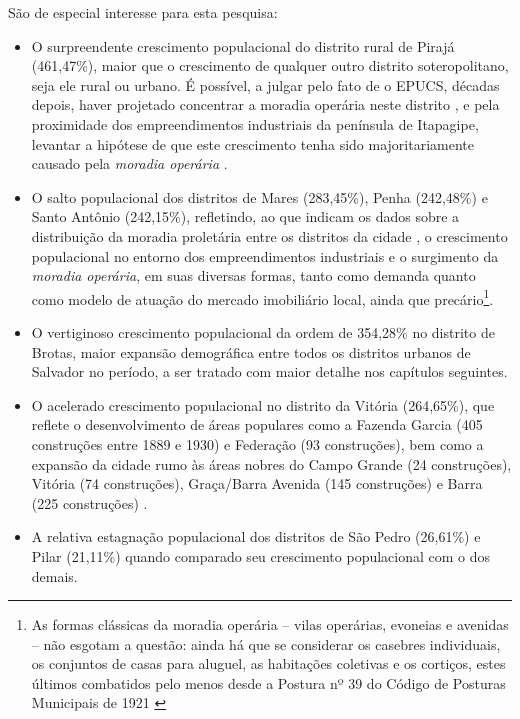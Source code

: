 


São de especial interesse para esta pesquisa:

\begin{itemize}
\item O surpreendente crescimento populacional do distrito rural de Pirajá (461,47\%), maior que o crescimento de qualquer outro distrito soteropolitano, seja ele rural ou urbano. É possível, a julgar pelo fato de o EPUCS, décadas depois, haver projetado concentrar a moradia operária neste distrito \cite{PREFEITURA1978,sampaio_formas_1999}, e pela proximidade dos empreendimentos industriais da península de Itapagipe, levantar a hipótese de que este crescimento tenha sido majoritariamente causado pela \textit{moradia operária} \cite{cardoso_vilas_1991}.
\item O salto populacional dos distritos de Mares (283,45\%), Penha (242,48\%) e Santo Antônio (242,15\%), refletindo, ao que indicam os dados sobre a distribuição da moradia proletária entre os distritos da cidade \cite[p.~126]{cardoso_vilas_1991}, o crescimento populacional no entorno dos empreendimentos industriais e o surgimento da \textit{moradia operária}, em suas diversas formas, tanto como demanda quanto como modelo de atuação do mercado imobiliário local, ainda que precário\footnote{As formas clássicas da moradia operária -- vilas operárias, evoneias e avenidas -- não esgotam a questão: ainda há que se considerar os casebres individuais, os conjuntos de casas para aluguel, as habitações coletivas e os cortiços, estes últimos combatidos pelo menos desde a Postura nº 39 do Código de Posturas Municipais de 1921 \cite{PREFEITURA1921}}.
\item O vertiginoso crescimento populacional da ordem de 354,28\% no distrito de Brotas, maior expansão demográfica entre todos os distritos urbanos de Salvador no período, a ser tratado com maior detalhe nos capítulos seguintes.
\item O acelerado crescimento populacional no distrito da Vitória (264,65\%), que reflete o desenvolvimento de áreas populares como a Fazenda Garcia (405 construções entre 1889 e 1930) e Federação (93 construções), bem como a expansão da cidade rumo às áreas nobres do Campo Grande (24 construções), Vitória (74 construções), Graça/Barra Avenida (145 construções) e Barra (225 construções) \cite[p.~295]{ALMEIDA1997}.
\item A relativa estagnação populacional dos distritos de São Pedro (26,61\%) e Pilar (21,11\%) quando comparado seu crescimento populacional com o dos demais. 

\end{itemize}
